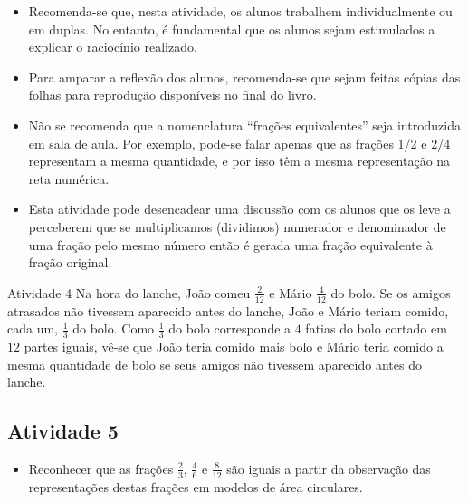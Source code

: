 \begin{itemize}
    \item       Recomenda-se que, nesta atividade, os alunos trabalhem
individualmente ou em duplas. No entanto, é fundamental que os alunos sejam
estimulados a explicar o raciocínio realizado.
    \item       Para amparar a reflexão dos alunos, recomenda-se que sejam
feitas cópias das             folhas para reprodução disponíveis no final do
livro.
    \item       Não se recomenda que a nomenclatura       ``frações
equivalentes''       seja introduzida em sala de aula. Por exemplo, pode-se
falar apenas que as frações 1/2 e 2/4 representam a mesma quantidade, e por isso
têm a mesma representação na reta numérica.
    \item       Esta atividade pode desencadear uma discussão com os alunos que
os leve a perceberem que se multiplicamos (dividimos) numerador e denominador de
uma fração pelo mesmo número então é gerada uma fração equivalente à fração
original.
\end{itemize} %

\begin{resposta*}{Atividade 4}
  Na hora do lanche, João comeu   $\frac{2}{12}$   e Mário   $\frac{4}{12}$   do
bolo. Se os amigos atrasados não tivessem aparecido antes do lanche, João e
Mário teriam comido, cada um,   $\frac{1}{3}$   do bolo. Como   $\frac{1}{3}$
do bolo corresponde a   $4$   fatias do bolo cortado em   $12$   partes iguais,
vê-se que João teria comido mais bolo e Mário teria comido a mesma quantidade de
bolo se seus amigos não tivessem aparecido antes do lanche.
\end{resposta*}

\newpage

\subsection{Atividade 5}

\begin{itemize} %
    \item       Reconhecer que as frações       $\frac{2}{3}$,
$\frac{4}{6}$       e       $\frac{8}{12}$       são iguais a partir da
observação das representações destas frações em modelos de área circulares.
\end{itemize} %


